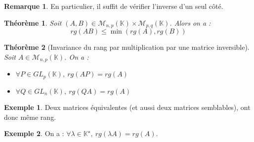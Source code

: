 \documentclass[french]{book}
\newcommand{\K}{\mathbb{K}}
\newcommand{\st}{^\star}
\theoremstyle{plain}
\newtheorem{thm}{Théorème}[chapter]
\theoremstyle{definition}
\newtheorem{exa}{Exemple}[chapter]
\newtheorem{rmq}{Remarque}[chapter]
\theoremstyle{remark}
\begin{document}
\begin{rmq}
	En particulier, il suffit de vérifier l'inverse d'un seul côté.
\end{rmq}
\begin{thm}
	Soit $(A,B)\in\mathcal{M}_{n,p}(\K)\times\mathcal{M}_{p,q}(\K)$. Alors on a : $$rg(AB)\leqslant\min(rg(A),rg(B))$$
\end{thm}
\begin{thm}[Invariance du rang par multiplication par une matrice inversible]
	Soit $A\in\mathcal{M}_{n,p}(\K)$. On a : \begin{itemize}
		\item $\forall P\in GL_p(\K),\ rg(AP)=rg(A)$
		\item $\forall Q\in GL_n(\K),\ rg(QA)=rg(A)$
	\end{itemize}
\end{thm}
\begin{exa}
	Deux matrices équivalentes (et aussi deux matrices semblables), ont donc même rang.
\end{exa}
\begin{exa}
	On a : $\forall \lambda\in\K\st,\ rg(\lambda A)=rg(A)$.
\end{exa}
\end{document}
